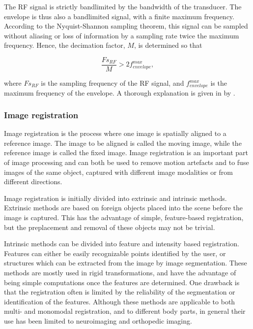 The RF signal is strictly bandlimited by the bandwidth of the transducer. The envelope is thus also a bandlimited signal, with a finite maximum frequency. According to the Nyquist-Shannon sampling theorem, this signal can be sampled without aliasing or loss of information by a sampling rate twice the maximum frequency. Hence, the decimation factor, $M$, is determined so that

\begin{equation}
\label{deciamtion}
\frac{Fs_{RF}}{M} > 2f^{max}_{envelope},
\end{equation}

where $Fs_{RF}$ is the sampling frequency of the RF signal, and $f^{max}_{envelope}$ is the maximum frequency of the envelope. A thorough explanation is given in by \citet{Crochiere1981}.


\subsubsection{Image registration}
Image registration is the process where one image is spatially aligned to a reference image. The image to be aligned is called the moving image, while the reference image is called the fixed image. Image registration  is an important part of image processing and can both be used to remove motion artefacts and to fuse images of the same object, captured with different image modalities or from different directions. 

Image registration is initially divided into extrinsic and intrinsic methods. Extrinsic methods are based on foreign objects placed into the scene before the image is captured. This has the advantage of simple, feature-based registration, but the preplacement and removal of these objects may not be trivial. 

Intrinsic methods can be divided into feature and intensity based registration. Features can either be easily recognizable points identified by the user, or structures which can be extracted from the image by image segmentation. These methods are mostly used in rigid transformations, and have the advantage of being simple computations once the features are determined. One drawback is that the registration often is limited by the reliability of the segmentation or identification of the features. Although these methods are applicable to both multi- and monomodal registration, and to different body parts, in general their use has been limited to neuroimaging and orthopedic imaging\cite{Maintz1998}.

